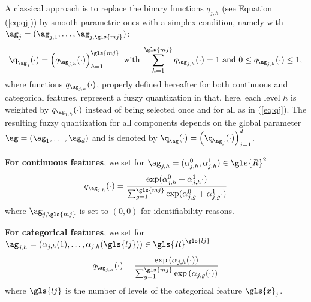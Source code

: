 A classical approach is to replace the binary functions $q_{j,h}$ (see Equation (\ref{eq:qj}))  by smooth parametric ones  with a simplex condition, namely with $\ag_j=(\ag_{j,1},\ldots, \ag_{j,\gls{mj}})$:
\begin{equation*}
    {\q_{\ag_j}(\cdot)=\left(q_{\ag_{j,h}}(\cdot)\right)_{h=1}^{\gls{mj}} \text{ with } \sum_{h=1}^{\gls{mj}}q_{\ag_{j,h}}(\cdot)=1 \text{ and } 0 \leq q_{\ag_{j,h}}(\cdot) \leq 1,}
\end{equation*}
where functions $q_{\ag_{j,h}}(\cdot)$, properly defined hereafter for both continuous and categorical features, represent a fuzzy quantization in that, here, each level $h$ is weighted by $q_{\ag_{j,h}}(\cdot)$ instead of being selected once and for all as in (\ref{eq:qj}). The resulting fuzzy quantization for all components depends on the global parameter $\ag = (\ag_1, \ldots, \ag_d)$ and is denoted by $\q_{\ag}(\cdot)=\left(\q_{\ag_j}(\cdot)\right)_{j=1}^d$. 




 {\bf For continuous features}, we set for $\ag_{j,h} = (\alpha^0_{j,h},\alpha^1_{j,h}) \in \gls{R}^2$
\begin{equation} \label{eq:softmax}
q_{\ag_{j,h}}(\cdot) = \frac{\exp(\alpha^0_{j,h} + \alpha^1_{j,h}  \cdot)}{\sum_{g=1}^{\gls{mj}} \exp(\alpha^0_{j,g} + \alpha^1_{j,g}  \cdot)}
\end{equation}
where $\ag_{j,\gls{mj}}$ is set to $(0,0)$ for identifiability reasons.




{\bf For categorical features}, we set for $\ag_{j,h}=\left(\alpha_{j,h}(1),\ldots, \alpha_{j,h}(\gls{lj})\right) \in \gls{R}^{\gls{lj}}$
\[q_{\ag_{j,h}}(\cdot) = \frac{\exp\left(\alpha_{j,h}(\cdot)\right)}{\sum_{g=1}^{\gls{mj}} \exp\left(\alpha_{j,g}(\cdot)\right)}\]
where $\gls{lj}$ is the number of levels of the categorical feature $\gls{x}_j$.



